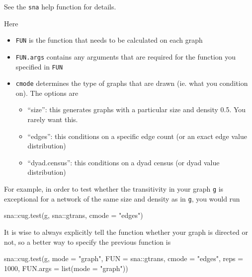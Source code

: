 \documentclass[
]{article}
\newenvironment{Shaded}{\begin{snugshade}}{\end{snugshade}}
\newcommand{\AttributeTok}[1]{\textcolor[rgb]{0.77,0.63,0.00}{#1}}
\newcommand{\DecValTok}[1]{\textcolor[rgb]{0.00,0.00,0.81}{#1}}
\newcommand{\FunctionTok}[1]{\textcolor[rgb]{0.00,0.00,0.00}{#1}}
\newcommand{\NormalTok}[1]{#1}
\newcommand{\SpecialCharTok}[1]{\textcolor[rgb]{0.00,0.00,0.00}{#1}}
\newcommand{\StringTok}[1]{\textcolor[rgb]{0.31,0.60,0.02}{#1}}
\begin{document}
See the \texttt{sna} help function for details.

Here

\begin{itemize}
\item
  \texttt{FUN} is the function that needs to be calculated on each graph
\item
  \texttt{FUN.args} contains any arguments that are required for the
  function you specified in \texttt{FUN}
\item
  \texttt{cmode} determines the type of graphs that are drawn (ie. what
  you condition on). The options are

  \begin{itemize}
  \item
    ``size'': this generates graphs with a particular size and density
    0.5. You rarely want this.
  \item
    ``edges'': this conditions on a specific edge count (or an exact
    edge value distribution)
  \item
    ``dyad.census'': this conditions on a dyad census (or dyad value
    distribution)
  \end{itemize}
\end{itemize}

For example, in order to test whether the transitivity in your graph
\texttt{g} is exceptional for a network of the same size and density as
in \texttt{g}, you would run

\begin{Shaded}
\begin{Highlighting}[]
\NormalTok{sna}\SpecialCharTok{::}\FunctionTok{cug.test}\NormalTok{(g, sna}\SpecialCharTok{::}\NormalTok{gtrans, }\AttributeTok{cmode =} \StringTok{"edges"}\NormalTok{)}
\end{Highlighting}
\end{Shaded}

It is wise to always explicitly tell the function whether your graph is
directed or not, so a better way to specify the previous function is

\begin{Shaded}
\begin{Highlighting}[]
\NormalTok{sna}\SpecialCharTok{::}\FunctionTok{cug.test}\NormalTok{(g, }\AttributeTok{mode =} \StringTok{"graph"}\NormalTok{, }\AttributeTok{FUN =}\NormalTok{ sna}\SpecialCharTok{::}\NormalTok{gtrans,}
              \AttributeTok{cmode =} \StringTok{"edges"}\NormalTok{, }\AttributeTok{reps =} \DecValTok{1000}\NormalTok{,}
              \AttributeTok{FUN.args =} \FunctionTok{list}\NormalTok{(}\AttributeTok{mode =} \StringTok{"graph"}\NormalTok{))}
\end{Highlighting}
\end{Shaded}
\end{document}
